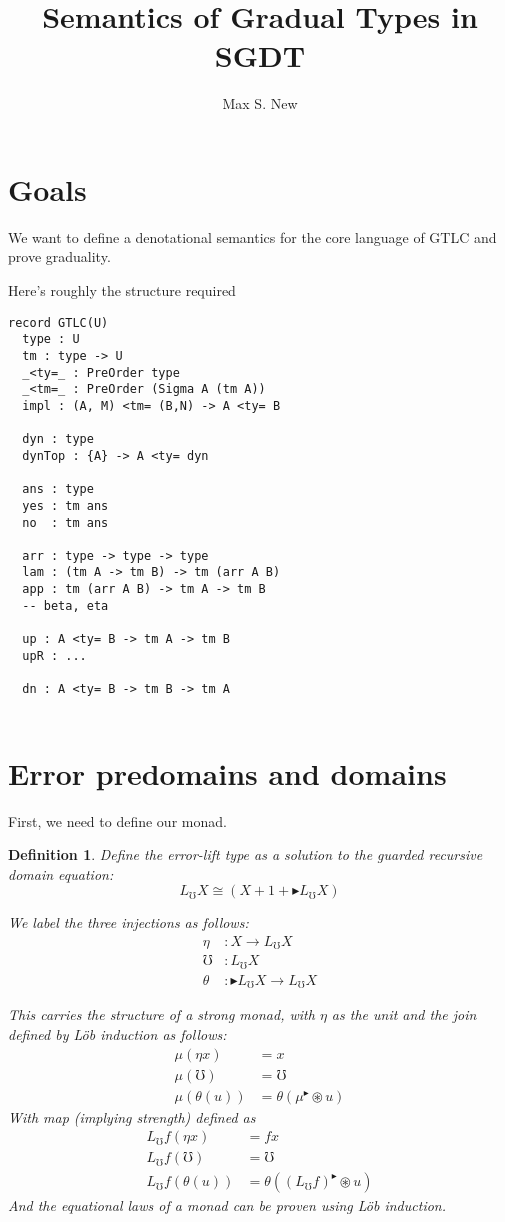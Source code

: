\documentclass{article}
\newtheorem{definition}{Definition}[section]
\newcommand{\later}{{\blacktriangleright}}
\newcommand{\err}{\mho}
\newcommand{\errlift}{L_\err}
\newcommand{\ostar}{\circledast}
\begin{document}
\title{Semantics of Gradual Types in SGDT}
\author{Max S. New}

\maketitle

\section{Goals}

We want to define a denotational semantics for the core language of
GTLC and prove graduality.

Here's roughly the structure required
\begin{verbatim}
record GTLC(U)
  type : U
  tm : type -> U
  _<ty=_ : PreOrder type
  _<tm=_ : PreOrder (Sigma A (tm A))
  impl : (A, M) <tm= (B,N) -> A <ty= B

  dyn : type
  dynTop : {A} -> A <ty= dyn

  ans : type
  yes : tm ans
  no  : tm ans

  arr : type -> type -> type
  lam : (tm A -> tm B) -> tm (arr A B)
  app : tm (arr A B) -> tm A -> tm B
  -- beta, eta

  up : A <ty= B -> tm A -> tm B
  upR : ...

  dn : A <ty= B -> tm B -> tm A
  
\end{verbatim}

\section{Error predomains and domains}

First, we need to define our monad.
\begin{definition}
  Define the error-lift type as a solution to the guarded recursive
  domain equation:
  \[ \errlift X \cong (X + 1 + \later \errlift X) \]

  We label the three injections as follows:
  \begin{align*}
    \eta &: X \to \errlift X\\
    \err &: \errlift X\\
    \theta &: \later \errlift X \to \errlift X
  \end{align*}

  This carries the structure of a strong monad, with $\eta$ as the
  unit and the join defined by L\"ob induction as follows:
  \begin{align*}
    \mu(\eta x) &= x\\
    \mu(\mho) &= \mho\\
    \mu(\theta(u)) &= \theta (\mu^\later \ostar u)
  \end{align*}
  With map (implying strength) defined as
  \begin{align*}
    \errlift f(\eta x) &= f x\\
    \errlift f(\mho) &= \mho\\
    \errlift f(\theta(u)) &= \theta ((\errlift f)^\later \ostar u)
  \end{align*}
  And the equational laws of a monad can be proven using L\"ob
  induction.
\end{definition}
\end{document}
